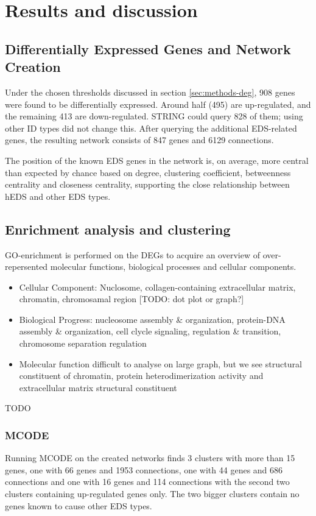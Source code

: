 \section{Results and discussion}
\subsection{Differentially Expressed Genes and Network Creation}

Under the chosen thresholds discussed in section \ref{sec:methods-deg}, 908 genes were found to be differentially expressed. Around half (495) are up-regulated, and the remaining 413 are down-regulated. STRING could query 828 of them; using other ID types did not change this. After querying the additional EDS-related genes, the resulting network consists of 847 genes and 6129 connections.

The position of the known EDS genes in the network is, on average, more central than expected by chance based on degree, clustering coefficient, betweenness centrality and closeness centrality, supporting the close relationship between hEDS and other EDS types.

\subsection{Enrichment analysis and clustering}

GO-enrichment is performed on the DEGs to acquire an overview of over-repersented molecular functions, biological processes and cellular components.  

\begin{itemize}
	\item Cellular Component: Nuclosome, collagen-containing extracellular matrix, chromatin, chromosamal region [TODO: dot plot or graph?]
	\item Biological Progress: nucleosome assembly \& organization, protein-DNA assembly \& organization, cell clycle signaling, regulation \& transition, chromosome separation regulation
	\item Molecular function difficult to analyse on large graph, but we see structural constituent of chromatin, protein heterodimerization activity and extracellular matrix structural constituent
\end{itemize}


TODO

\subsubsection{MCODE}
Running MCODE on the created networks finds 3 clusters with more than 15 genes, one with 66 genes and 1953 connections, one with 44 genes and 686 connections and one with 16 genes and 114 connections with the second two clusters containing up-regulated genes only. The two bigger clusters contain no genes known to cause other EDS types. %

